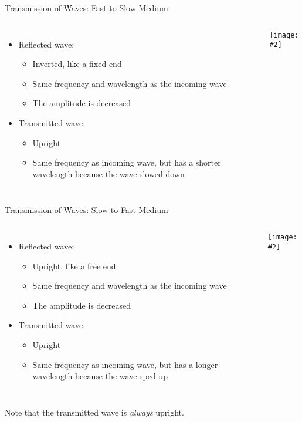 \documentclass[12pt,aspectratio=169]{beamer}
\newcommand{\pic}[2]{\texttt{[image: \#2]}}
\begin{document}
\begin{frame}{Transmission of Waves: Fast to Slow Medium}
  \begin{columns}
    \begin{itemize}
    \item Reflected wave:
      \begin{itemize}
      \item Inverted, like a fixed end
      \item Same frequency and wavelength as the incoming wave
      \item The amplitude is decreased
      \end{itemize}
    \item Transmitted wave:
      \begin{itemize}
      \item Upright
      \item Same frequency as incoming wave, but has a shorter wavelength
        because the wave slowed down
      \end{itemize}
    \end{itemize}
    
    \pic{1}{23.jpg}
  \end{columns}
\end{frame}


\begin{frame}{Transmission of Waves: Slow to Fast Medium}
  \begin{columns}
    \begin{itemize}
    \item Reflected wave:
      \begin{itemize}
      \item Upright, like a free end
      \item Same frequency and wavelength as the incoming wave
      \item The amplitude is decreased
      \end{itemize}
    \item Transmitted wave:
      \begin{itemize}
      \item Upright
      \item Same frequency as incoming wave, but has a longer wavelength because
        the wave sped up
      \end{itemize}
    \end{itemize}
    
    \pic{1}{24.jpg}
  \end{columns}
  Note that the transmitted wave is \emph{always} upright.
\end{frame}
\end{document}
